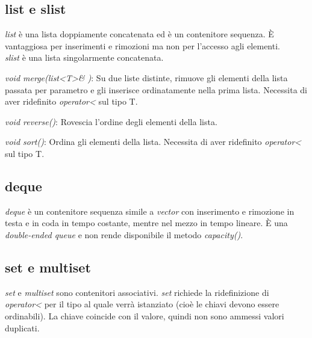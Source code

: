 \subsection{list e slist}
\textit{list} è una lista doppiamente concatenata ed è un contenitore sequenza. \`{E} vantaggiosa per inserimenti e rimozioni ma non per l'accesso agli elementi.\\
\textit{slist} è una lista singolarmente concatenata.

\begin{description}
	\item \textit{void merge(list<T>\& )}: Su due liste distinte, rimuove gli elementi della lista passata per parametro e gli inserisce ordinatamente nella prima lista. Necessita di aver ridefinito \textit{operator<} sul tipo T.
	\item \textit{void reverse()}: Rovescia l'ordine degli elementi della lista.
	\item \textit{void sort()}: Ordina gli elementi della lista.  Necessita di aver ridefinito \textit{operator<} sul tipo T.
\end{description}

\subsection{deque}
\textit{deque} è un contenitore sequenza simile a \textit{vector} con inserimento e rimozione in testa e in coda in tempo costante, mentre nel mezzo in tempo lineare. \`{E} una \textit{double-ended queue} e non rende disponibile il metodo \textit{capacity()}.
 
\subsection{set e multiset}

\textit{set} e \textit{multiset} sono contenitori associativi. 
\textit{set} richiede la ridefinizione di \textit{operator<} per il tipo al quale verrà istanziato (cioè le chiavi devono essere ordinabili). La chiave coincide con il valore, quindi non sono ammessi valori duplicati.




